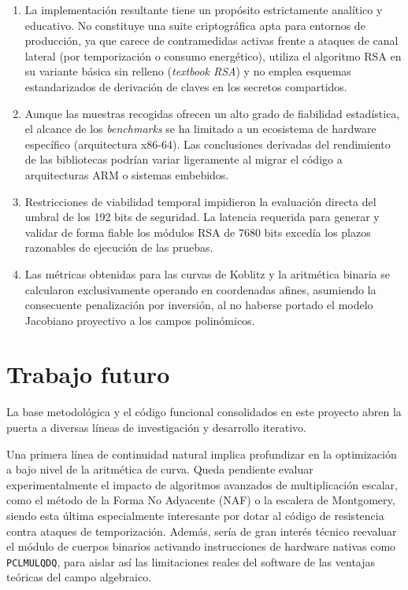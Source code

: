 \begin{enumerate}
    \item La implementación resultante tiene un propósito estrictamente analítico y educativo. No constituye una suite criptográfica apta para entornos de producción, ya que carece de contramedidas activas frente a ataques de canal lateral (por temporización o consumo energético), utiliza el algoritmo RSA en su variante básica sin relleno (\textit{textbook RSA}) y no emplea esquemas estandarizados de derivación de claves en los secretos compartidos.
    \item Aunque las muestras recogidas ofrecen un alto grado de fiabilidad estadística, el alcance de los \textit{benchmarks} se ha limitado a un ecosistema de hardware específico (arquitectura x86-64). Las conclusiones derivadas del rendimiento de las bibliotecas podrían variar ligeramente al migrar el código a arquitecturas ARM o sistemas embebidos.
    \item Restricciones de viabilidad temporal impidieron la evaluación directa del umbral de los 192 bits de seguridad. La latencia requerida para generar y validar de forma fiable los módulos RSA de 7680 bits excedía los plazos razonables de ejecución de las pruebas.
    \item Las métricas obtenidas para las curvas de Koblitz y la aritmética binaria se calcularon exclusivamente operando en coordenadas afines, asumiendo la consecuente penalización por inversión, al no haberse portado el modelo Jacobiano proyectivo a los campos polinómicos.
\end{enumerate}

\section{Trabajo futuro}
\label{sec:conc-futuro}

La base metodológica y el código funcional consolidados en este proyecto abren la puerta a diversas líneas de investigación y desarrollo iterativo.

Una primera línea de continuidad natural implica profundizar en la optimización a bajo nivel de la aritmética de curva. Queda pendiente evaluar experimentalmente el impacto de algoritmos avanzados 
de multiplicación escalar, como el método de la Forma No Adyacente (NAF) o la escalera de Montgomery, siendo esta última especialmente interesante por dotar al código de resistencia contra ataques 
de temporización. Además, sería de gran interés técnico reevaluar el módulo de cuerpos binarios activando instrucciones de hardware nativas como \texttt{PCLMULQDQ}, para aislar así las limitaciones 
reales del software de las ventajas teóricas del campo algebraico.

